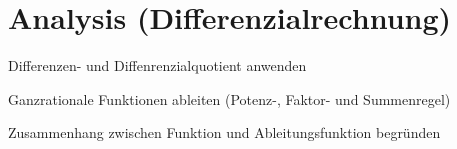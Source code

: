 \documentclass[
    ngerman,
    color=1b,
    load_common,
    leqno,
    boxarc,
    solution=true,
]{rubos-tuda-template}
\begin{document}
\section*{Analysis (Differenzialrechnung)}
\begin{task}[points=1]{Differenzen- und Diffenrenzialquotient anwenden}

\end{task}
\begin{task}[points=1]{Ganzrationale Funktionen ableiten (Potenz-, Faktor- und Summenregel)}

\end{task}
\clearpage
\begin{task}[points=1]{Zusammenhang zwischen Funktion und Ableitungsfunktion begründen}
    \def\coordinatesystemradius{4}




\end{task}
\end{document}

